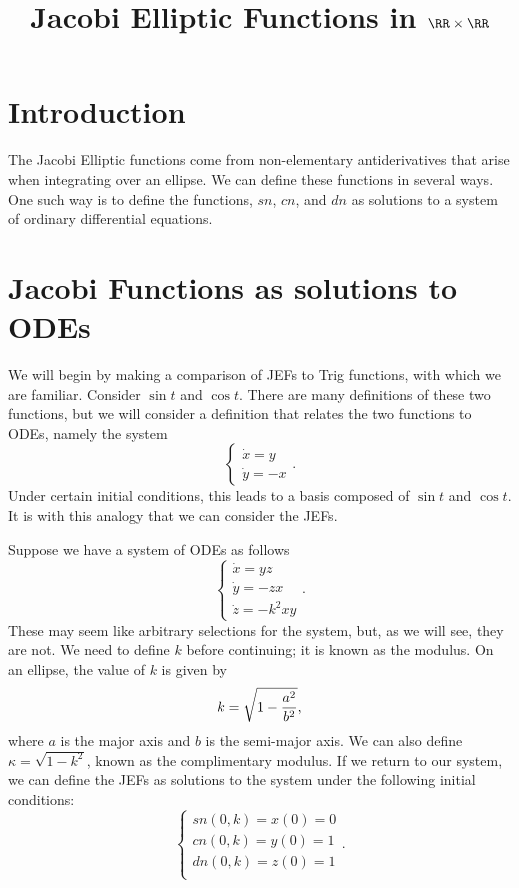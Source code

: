 \documentclass[notitlepage]{hw}
\title{Jacobi Elliptic Functions in $\RR\times\RR$}
\date{}
\author{}
\begin{document}
\maketitle

\section{Introduction}

The Jacobi Elliptic functions come from non-elementary antiderivatives that arise when integrating
over an ellipse. We can define these functions in several ways. One such way is to define the
functions, $sn$, $cn$, and $dn$ as solutions to a system of ordinary differential equations.

\section{Jacobi Functions as solutions to ODEs}

We will begin by making a comparison of JEFs to Trig functions, with which we are familiar. Consider
$\sin{t}$ and $\cos{t}$. There are many definitions of these two functions, but we will consider a
definition that relates the two functions to ODEs, namely the system
\[
\begin{cases}
\dot{x}=y\\
\dot{y}=-x
\end{cases}.
\]
Under certain initial conditions, this leads to a basis composed of $\sin{t}$ and $\cos{t}$. It is with
this analogy that we can consider the JEFs.

Suppose we have a system of ODEs as follows
\[
\begin{cases}
\dot{x}=yz\\
\dot{y}=-zx\\
\dot{z}=-k^{2}xy
\end{cases}.
\]
These may seem like arbitrary selections for the system, but, as we will see, they are not. We need
to define $k$ before continuing; it is known as the modulus. On an ellipse, the value of $k$ is given
by
\[
k=\sqrt{1-{a^{2}\over b^{2}}},
\]
where $a$ is the major axis and $b$ is the semi-major axis.
We can also define $\kappa=\sqrt{1-k^{2}}$, known as the complimentary modulus. If we return to
our system, we can define the JEFs as solutions to the system under the following initial conditions:
\[
\begin{cases}
sn(0,k)=x(0)=0\\
cn(0,k)=y(0)=1\\
dn(0,k)=z(0)=1\\
\end{cases}.
\]
\end{document}
